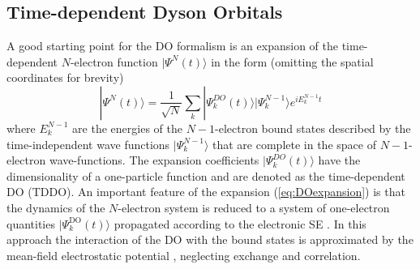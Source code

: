 \subsection{Time-dependent Dyson Orbitals}
A good starting point for the DO formalism is an expansion of the time-dependent $N$-electron function $|\Psi^N(t)\rangle$ in the form (omitting the spatial coordinates for brevity)
\begin{equation} \label{eq:DOexpansion}
| \Psi^N (t)\rangle =\frac{1}{\sqrt{N}} \sum_k |\Psi_k^{DO}(t)\rangle | \Psi^{N-1}_k \rangle e^{iE_k^{N-1}t}
\end{equation}
where $E_k^{N-1}$ are the energies of the $N-1$-electron bound states described by the time-independent wave functions $|\Psi_k^{N-1}\rangle$ that are complete in the space of $N-1$-electron wave-functions.
The expansion coefficients $|\Psi_k^{DO}(t)\rangle$ have the dimensionality of a one-particle function and are denoted as the time-dependent DO (TDDO).
An important feature of the expansion (\ref{eq:DOexpansion}) is that the dynamics of the $N$-electron system is reduced to a system of one-electron quantities $|\Psi_k^\text{DO}(t)\rangle$ propagated according to the electronic SE \cite{TD-do}.
In this approach the interaction of the DO with the bound states is approximated by the mean-field electrostatic potential \cite{TD-do}, neglecting exchange and correlation.

